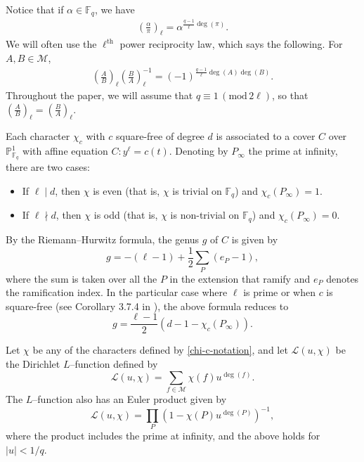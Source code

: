 \documentclass[12pt]{amsart}
\newcommand{\F}{\mathbb{F}}
\renewcommand{\pmod}[1]{\,(\mathrm{mod}\,#1)}
\def\cM{\mathcal{M}}
\newcommand{\legl}[2]{\left( \frac{#1}{#2} \right)_\ell}
\begin{document}
Notice that if $\alpha \in \F_q$, we have 
\begin{align*} %
\legl{\alpha}{\pi} = \alpha^{\frac{q-1}{\ell} \deg(\pi)}.
\end{align*}
We will often use the $\ell^{\text{th}}$ power reciprocity law, which says the following. For $A, B \in \cM$, 
\begin{align*}
\legl{A}{B} \legl{B}{A}^{-1} = (-1)^{\frac{q-1}{\ell} \deg(A) \deg(B)}.
\end{align*}
Throughout the paper, we will assume that $q \equiv 1 \pmod{2\ell}$, so
that $\legl{A}{B} =\legl{B}{A}$.


Each character $\chi_c$ with $c$ square-free of degree $d$ is associated to a
 cover $C$  over  $\mathbb{P}^1_{\F_q}$ with affine equation
$C: y^\ell = c(t)$.  Denoting by $P_\infty$ the prime at infinity, there are two cases:
\begin{itemize}
 \item[] If $\ell \mid d$, then  $\chi$ is even (that is, $\chi$ is trivial on $\F_q$) and  $\chi_c(P_\infty)=1$.
 \item[] If $\ell \nmid d$, then $\chi$ is odd (that is, $\chi$ is non-trivial on $\F_q$) and $\chi_c(P_\infty)=0$.
  \end{itemize}
By the Riemann--Hurwitz formula, the genus $g$ of $C$ is given by
\[g=-(\ell-1)+\frac{1}{2}\sum_P(e_P-1),\]
where the sum is taken over all the $P$ in the extension that ramify and $e_P$ denotes the ramification index. In the particular case where $\ell$ is prime or when $c$ is square-free (see Corollary  3.7.4 in \cite{Stichtenoth}), the above formula reduces to
 \begin{equation}
 \label{genus}
 g=\frac{\ell-1}{2}(d-1-\chi_c(P_\infty)).
 \end{equation}
  
Let $\chi$ be any of the characters defined by \eqref{chi-c-notation}, and let $\mathcal{L}(u,\chi)$ be the Dirichlet $L$--function defined by
\begin{equation*}
\mathcal{L}(u,\chi) = \sum_{f \in \mathcal{M}} \chi(f) u^{\deg(f)}.
\end{equation*}
The $L$--function also has an Euler product given by
\begin{equation}\label{eq:Eulerprod}\mathcal{L}(u, \chi)=\prod_P (1-\chi(P)u^{\deg(P)})^{-1},\end{equation}
where the product includes the prime at infinity, and the above holds for $|u|<1/q$.
\end{document}
